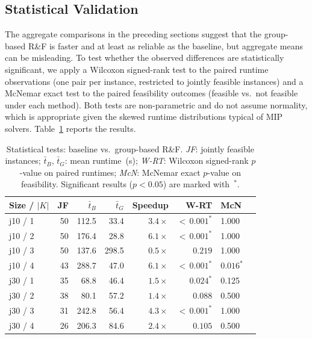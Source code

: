 \subsection{Statistical Validation}
\label{subsec:stat_tests}
The aggregate comparisons in the preceding sections suggest that
the group-based R\&F is faster and at least as reliable as the
baseline, but aggregate means can be misleading. To test whether
the observed differences are statistically significant, we apply
a Wilcoxon signed-rank test to the paired runtime observations
(one pair per instance, restricted to jointly feasible instances)
and a McNemar exact test to the paired feasibility outcomes
(feasible vs.\ not feasible under each method). Both tests are
non-parametric and do not assume normality, which is appropriate
given the skewed runtime distributions typical of MIP solvers.
Table~\ref{tab:stat_tests} reports the results.
\begin{table}[htbp]
\centering
\renewcommand{\arraystretch}{1.35}
\caption{Statistical tests: baseline vs.\ group-based R\&F.
         \emph{JF}: jointly feasible instances;
         $\bar{t}_B$, $\bar{t}_G$: mean runtime~(s);
         \emph{W-RT}: Wilcoxon signed-rank $p$-value on
         paired runtimes;
         \emph{McN}: McNemar exact $p$-value on feasibility.
         Significant results ($p < 0.05$) are marked
         with~$^{*}$.}
\label{tab:stat_tests}
\begin{tabular}{l r r r r r l l}
\hline
\textbf{Size / $|K|$} &
\textbf{JF} &
$\bar{t}_B$ &
$\bar{t}_G$ &
\textbf{Speedup} &
\textbf{W-RT} &
\textbf{McN} \\
\hline
j10 / 1 & 50 & 112.5 &  33.4 & $3.4\times$ & ${<}\,0.001^{*}$ & 1.000 \\
j10 / 2 & 50 & 176.4 &  28.8 & $6.1\times$ & ${<}\,0.001^{*}$ & 1.000 \\
j10 / 3 & 50 & 137.6 & 298.5 & $0.5\times$ & $0.219$          & 1.000 \\
j10 / 4 & 43 & 288.7 &  47.0 & $6.1\times$ & ${<}\,0.001^{*}$ & $0.016^{*}$ \\
\hline
j30 / 1 & 35 &  68.8 &  46.4 & $1.5\times$ & $0.024^{*}$      & 0.125 \\
j30 / 2 & 38 &  80.1 &  57.2 & $1.4\times$ & $0.088$          & 0.500 \\
j30 / 3 & 31 & 242.8 &  56.4 & $4.3\times$ & ${<}\,0.001^{*}$ & 1.000 \\
j30 / 4 & 26 & 206.3 &  84.6 & $2.4\times$ & $0.105$          & 0.500 \\
\hline
\end{tabular}
\end{table}
